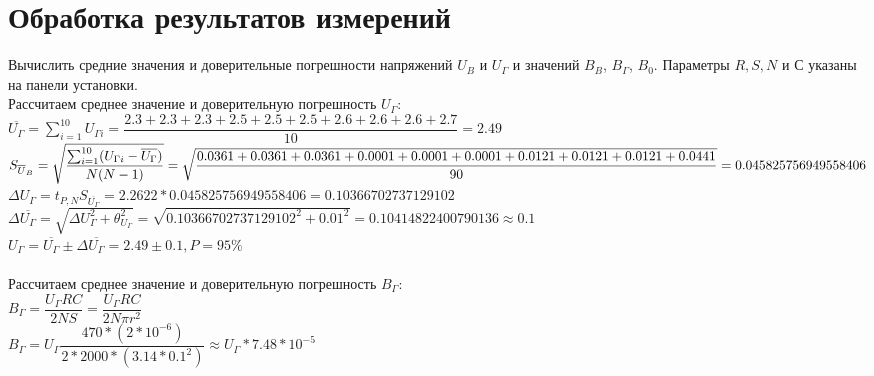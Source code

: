 \section*{Обработка результатов измерений}

Вычислить средние значения и доверительные погрешности напряжений $U_B$ и $U_{\Gamma}$ и
значений $ B_B $, $ B_\Gamma $, $ B_0 $. Параметры $ R, S, N $ и $ С $ указаны на панели установки.
\ \\ 

Рассчитаем среднее значение и доверительную погрешность $ U_\Gamma $:\\

$ 
\overline{U_{\Gamma}}= 
\sum_{i=1}^{10} U_{\Gamma i} = 
\dfrac{2.3 + 2.3 + 2.3 + 2.5 + 2.5 + 2.5 + 2.6 + 2.6 + 2.6 + 2.7}{10} 
= 2.49
$
\\

$
S_{\overline U_B} = 
\sqrt{
	\dfrac
	{
		\sum_{i=1}^{10}(U_{\Gamma i} - \overline{U_{\Gamma}})
	}
	{
		N(N-1)
	}
}
=\\
\sqrt{
	\dfrac
	{
		0.0361 + 0.0361 + 0.0361 + 0.0001 + 0.0001 + 0.0001 + 0.0121 + 0.0121 + 0.0121 + 0.0441
	}
	{
		90
	}
}
=\\
0.045825756949558406
$
\\

$ 
\varDelta U_{\Gamma} = 
t_{P,N}S_{\overline{U_{\Gamma}}} = 
2.2622 * 0.045825756949558406 = 
0.10366702737129102
$
\\

$ 
\varDelta \overline{U_{\Gamma}} = 
\sqrt{\varDelta U_{\Gamma}^2 + \theta_{U_{\Gamma}}^2} =
\sqrt{0.10366702737129102^2 + 0.01^2} = 
0.10414822400790136 \approx 
0.1
$
\\

$ U_{\Gamma} = 
\overline{U_{\Gamma}} \pm \varDelta \overline{U_{\Gamma}} = 
2.49 \pm 0.1, P = 95\%
$
\\

\ \\ 

Рассчитаем среднее значение и доверительную погрешность $ B_\Gamma $:\\

$ B_\Gamma = \dfrac{U_\Gamma RC}{2NS} = \dfrac{U_\Gamma RC}{2N\pi r^2} $
\\

$ B_\Gamma = U_\Gamma \dfrac{470 * (2 * 10^{-6})}{2 * 2000 * (3.14 * 0.1^2)} \approx U_\Gamma * 7.48 * 10^{-5} $
\\

